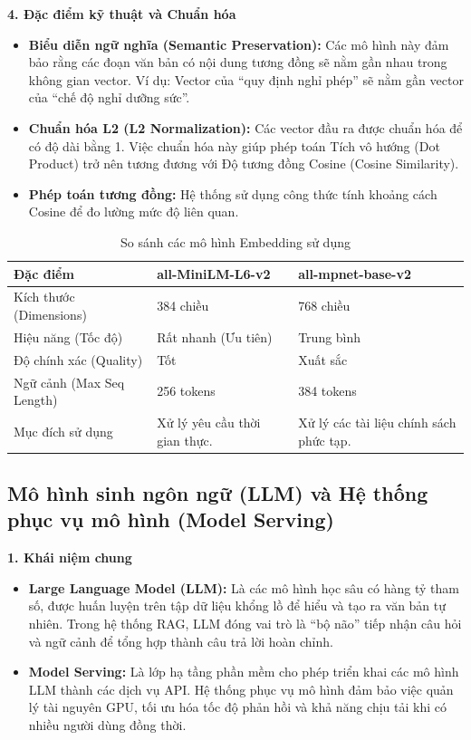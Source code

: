 \documentclass[12pt,a4paper]{report}
\begin{document}
\textbf{4. Đặc điểm kỹ thuật và Chuẩn hóa}
\begin{itemize}
    \item \textbf{Biểu diễn ngữ nghĩa (Semantic Preservation):} Các mô hình này đảm bảo rằng các đoạn văn bản có nội dung tương đồng sẽ nằm gần nhau trong không gian vector. Ví dụ: Vector của ``quy định nghỉ phép'' sẽ nằm gần vector của ``chế độ nghỉ dưỡng sức''.
    \item \textbf{Chuẩn hóa L2 (L2 Normalization):} Các vector đầu ra được chuẩn hóa để có độ dài bằng 1. Việc chuẩn hóa này giúp phép toán Tích vô hướng (Dot Product) trở nên tương đương với Độ tương đồng Cosine (Cosine Similarity).
    \item \textbf{Phép toán tương đồng:} Hệ thống sử dụng công thức tính khoảng cách Cosine để đo lường mức độ liên quan.
\end{itemize}

\begin{table}[H]
\centering
\caption{So sánh các mô hình Embedding sử dụng}
\label{tab:embedding_comparison}
\begin{tabularx}{\textwidth}{|l|X|X|}
\hline
\textbf{Đặc điểm} & \textbf{all-MiniLM-L6-v2} & \textbf{all-mpnet-base-v2} \\ \hline
Kích thước (Dimensions) & 384 chiều & 768 chiều \\ \hline
Hiệu năng (Tốc độ) & Rất nhanh (Ưu tiên) & Trung bình \\ \hline
Độ chính xác (Quality) & Tốt & Xuất sắc \\ \hline
Ngữ cảnh (Max Seq Length) & 256 tokens & 384 tokens \\ \hline
Mục đích sử dụng & Xử lý yêu cầu thời gian thực. & Xử lý các tài liệu chính sách phức tạp. \\ \hline
\end{tabularx}
\end{table}

\subsection{Mô hình sinh ngôn ngữ (LLM) và Hệ thống phục vụ mô hình (Model Serving)}
\textbf{1. Khái niệm chung}
\begin{itemize}
    \item \textbf{Large Language Model (LLM):} Là các mô hình học sâu có hàng tỷ tham số, được huấn luyện trên tập dữ liệu khổng lồ để hiểu và tạo ra văn bản tự nhiên. Trong hệ thống RAG, LLM đóng vai trò là ``bộ não'' tiếp nhận câu hỏi và ngữ cảnh để tổng hợp thành câu trả lời hoàn chỉnh.
    \item \textbf{Model Serving:} Là lớp hạ tầng phần mềm cho phép triển khai các mô hình LLM thành các dịch vụ API. Hệ thống phục vụ mô hình đảm bảo việc quản lý tài nguyên GPU, tối ưu hóa tốc độ phản hồi và khả năng chịu tải khi có nhiều người dùng đồng thời.
\end{itemize}
\end{document}
